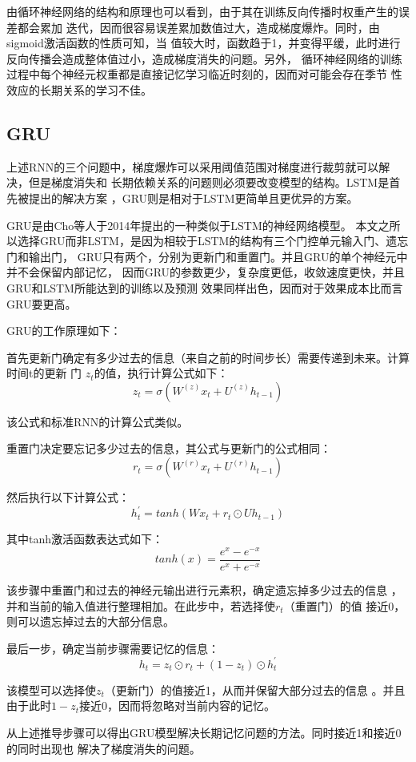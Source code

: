 \documentclass[AutoFakeBold]{LZUThesis}
\begin{document}
由循环神经网络的结构和原理也可以看到，由于其在训练反向传播时权重产生的误差都会累加
迭代，因而很容易误差累加数值过大，造成梯度爆炸。同时，由sigmoid激活函数的性质可知，当
值较大时，函数趋于1，并变得平缓，此时进行反向传播会造成整体值过小，造成梯度消失的问题。另外，
循环神经网络的训练过程中每个神经元权重都是直接记忆学习临近时刻的，因而对可能会存在季节
性效应的长期关系的学习不佳。

\subsection{GRU}
上述RNN的三个问题中，梯度爆炸可以采用阈值范围对梯度进行裁剪就可以解决，但是梯度消失和
长期依赖关系的问题则必须要改变模型的结构。LSTM是首先被提出的解决方案
\cite{hochreiter1997long}，GRU则是相对于LSTM更简单且更优异的方案。

GRU是由Cho等人于2014年提出的一种类似于LSTM的神经网络模型\cite{cho2014learning}。
本文之所以选择GRU而非LSTM，是因为相较于LSTM的结构有三个门控单元输入门、遗忘门和输出门，
GRU只有两个，分别为更新门和重置门。并且GRU的单个神经元中并不会保留内部记忆，
因而GRU的参数更少，复杂度更低，收敛速度更快，并且GRU和LSTM所能达到的训练以及预测
效果同样出色，因而对于效果成本比而言GRU要更高\cite{chung2014empirical}。

GRU的工作原理如下：

首先更新门确定有多少过去的信息（来自之前的时间步长）需要传递到未来。计算时间t的更新
门 $z_t$的值，执行计算公式如下：
$$z_t=\sigma(W^{(z)}x_t+U^{(z)}h_{t-1})$$

该公式和标准RNN的计算公式类似。

重置门决定要忘记多少过去的信息，其公式与更新门的公式相同：
$$r_t=\sigma(W^{(r)}x_t+U^{(r)}h_{t-1})$$

然后执行以下计算公式：
$$h^{\prime}_t=tanh(Wx_t+r_t\odot Uh_{t-1})$$

其中tanh激活函数表达式如下：
$$tanh(x) = \frac{e^x-e^{-x}}{e^x+e^{-x}}$$

该步骤中重置门和过去的神经元输出进行元素积，确定遗忘掉多少过去的信息
，并和当前的输入值进行整理相加。在此步中，若选择使$r_t$（重置门）的值
接近0，则可以遗忘掉过去的大部分信息。

最后一步，确定当前步骤需要记忆的信息：
$$h_t=z_t\odot r_t+(1-z_t)\odot h^{\prime}_t$$

该模型可以选择使$z_t$（更新门）的值接近1，从而并保留大部分过去的信息
。并且由于此时$1-z_t$接近0，因而将忽略对当前内容的记忆。

从上述推导步骤可以得出GRU模型解决长期记忆问题的方法。同时接近1和接近0的同时出现也
解决了梯度消失的问题。
\end{document}

